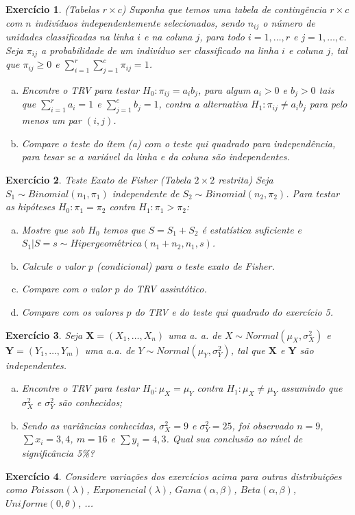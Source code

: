 \documentclass[letter,11pt]{article}
\newtheorem{exer}{Exercício}
\begin{document}
\begin{exer} \rm
\textit{(Tabelas $r \times c$)} Suponha que temos uma tabela de contingência $r \times c$ com $n$ indivíduos independentemente selecionados, sendo $n_{ij}$ o número de unidades classificadas na linha $i$ e na coluna $j$, para todo $i=1, \ldots, r$ e $j=1, \ldots, c$. Seja $\pi_{ij}$ a probabilidade de um indivíduo ser classificado na linha $i$ e coluna $j$, tal que $\pi_{ij} \geq 0$ e $\sum_{i=1}^{r} \sum_{j=1}^{c} \pi_{ij} = 1$.
\begin{enumerate}[a)]
  \item Encontre o TRV para testar $H_0: \pi_{ij} = a_i b_j$, para algum $a_i > 0$ e $b_j>0$ tais que $\sum_{i=1}^r a_i = 1$ e $\sum_{j=1}^c b_j = 1$, contra a alternativa $H_1: \pi_{ij} \neq a_i b_j$ para pelo menos um par $(i,j)$. 
  \item Compare o teste do ítem (a) com o teste qui quadrado para independência, para tesar se a variável da linha e da coluna são independentes.
\end{enumerate}
\end{exer}


\begin{exer} \rm
\textit{Teste Exato de Fisher}
\textit{(Tabela $2 \times 2$ restrita)} Seja $S_1 \sim Binomial(n_1, \pi_1)$ independente de $S_2 \sim Binomial(n_2, \pi_2)$. Para testar as hipóteses $H_0: \pi_1 = \pi_2$ contra $H_1: \pi_1 > \pi_2$:
\begin{enumerate}[a)]
  \item Mostre que sob $H_0$ temos que $S = S_1 + S_2$ é estatística suficiente e $S_1 \vert S = s \sim \textit{Hipergeométrica}(n_1+n_2, n_1, s)$.
  \item Calcule o valor $p$ (condicional) para o teste exato de Fisher.  
  \item Compare com o valor $p$ do TRV assintótico.
  \item Compare com os valores $p$ do TRV e do teste qui quadrado do exercício 5.
\end{enumerate}
\end{exer}


\clearpage
\begin{exer} \rm
Seja $\boldsymbol{X} = (X_1, \ldots, X_n)$ uma a. a. de $X \sim Normal(\mu_X, \sigma^2_X)$ e $\boldsymbol{Y} = (Y_1, \ldots, Y_m)$ uma a.a. de $Y \sim Normal(\mu_Y, \sigma^2_Y)$, tal que $\boldsymbol{X}$ e $\boldsymbol{Y}$ são independentes.
\begin{enumerate}[a)]
  \item Encontre o TRV para testar $H_0: \mu_X = \mu_Y$ contra $H_1: \mu_X \neq \mu_Y$ assumindo que $\sigma^2_X$ e $\sigma^2_Y$ são conhecidos;
  \item Sendo as variâncias conhecidas, $\sigma^2_X=9$ e $\sigma^2_Y=25$, foi observado $n=9$, $\sum x_i = 3,4$, $m=16$ e $\sum y_i = 4,3$. Qual sua conclusão ao nível de significância 5\%? 
\end{enumerate}
\end{exer}


\begin{exer} \rm
Considere variações dos exercícios acima para outras distribuições como $Poisson(\lambda)$, $Exponencial(\lambda)$, $Gama(\alpha, \beta)$, $Beta(\alpha, \beta)$, $Uniforme(0, \theta)$, ...
\end{exer}
\end{document}
